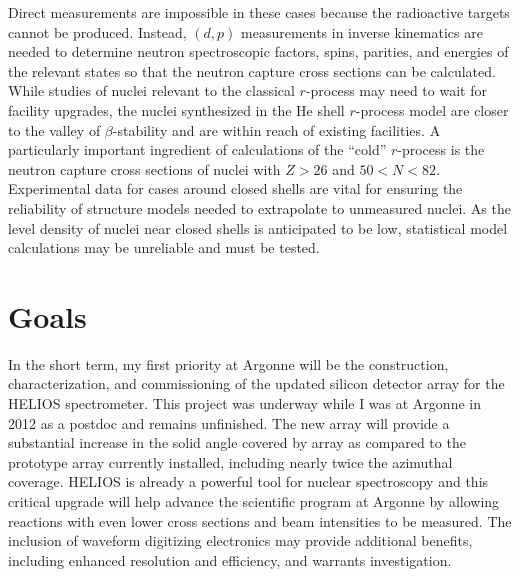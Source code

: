 {Direct measurements are impossible in these cases because  the radioactive targets cannot be produced. Instead, $(d,p)$ measurements in inverse kinematics are needed to determine neutron spectroscopic factors, spins, parities, and energies of the relevant states so that the neutron capture cross sections can be calculated.
While studies of nuclei relevant to the classical $r$-process may need to wait for facility upgrades, the nuclei synthesized in the He shell $r$-process model %
are closer to the valley of $\beta$-stability %
and are %
within reach %
of existing facilities.
A particularly important ingredient of calculations of the ``cold'' $r$-process %
is
the neutron capture cross sections of nuclei with $Z>26$ and $50<N<82$. Experimental data for cases around closed shells are vital for ensuring the reliability of structure models needed to extrapolate to unmeasured nuclei. As the level density of nuclei near closed shells is anticipated to be low, statistical model calculations may be unreliable and must be tested. %
\section*{Goals}
In the short term, my first priority at Argonne will be the construction, characterization, and commissioning of the updated silicon detector array for the HELIOS spectrometer.
This project was underway while I was at Argonne in 2012 as a postdoc and remains unfinished. 
The new array will provide a substantial increase in the solid angle covered by array as compared to the prototype array currently installed, including nearly twice the azimuthal coverage. %
HELIOS is already a powerful tool for nuclear spectroscopy and this critical upgrade will help 
advance the scientific program at Argonne by allowing reactions with even lower cross sections and beam intensities to be measured. The inclusion of waveform digitizing electronics may provide additional benefits, including enhanced resolution and efficiency, and warrants investigation.

}
